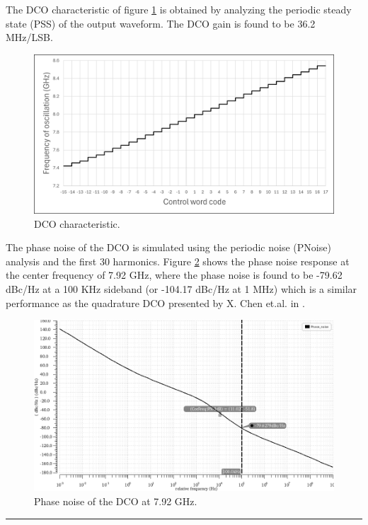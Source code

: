 The DCO characteristic of figure \ref{fig:DCO_characteristic} is obtained by analyzing the periodic steady state (PSS) of the output waveform. The DCO gain is found to be 36.2 MHz/LSB.

\begin{figure}[H]
    \centering
    \includegraphics[width=1\textwidth]{figures/DCO_characteristic.png}
    \caption{DCO characteristic.}
    \label{fig:DCO_characteristic}
\end{figure}

The phase noise of the DCO is simulated using the periodic noise (PNoise) analysis and the first 30 harmonics. Figure \ref{fig:DCO_phase_noise} shows the
phase noise response at the center frequency of 7.92 GHz, where the phase noise is found to be -79.62 dBc/Hz at a 100 KHz sideband (or -104.17 dBc/Hz at 1 MHz) which is
a similar performance as the quadrature DCO presented by X. Chen et.al. in \cite{DCO_Chen2023}.

\begin{figure}[H]
    \centering
    \includegraphics[width=1\textwidth]{figures/DCO_phase_noise.png}
    \caption{Phase noise of the DCO at 7.92 GHz.}
    \label{fig:DCO_phase_noise}
\end{figure}

\noindent\rule{\textwidth}{1pt}